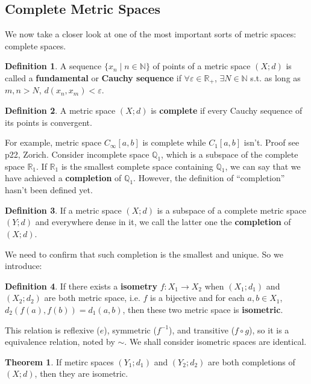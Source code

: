 \documentclass{article}
\theoremstyle{plain}
\theoremstyle{definition}
\newtheorem{dfn}{Definition}[section] %
\newtheorem{thrm}{Theorem}[section] %
\begin{document}
\subsection{Complete Metric Spaces}
We now take a closer look at one of the most important sorts of metric spaces: complete spaces.
\begin{dfn}\label{Cauchy_sequence}
A sequence $\{x_n\mid n\in \mathbb{N}\}$ of points of a metric space $(X;d)$ is called a \textbf{fundamental} or \textbf{Cauchy sequence} if $\forall \varepsilon \in\mathbb{R}_+$, $\exists N\in\mathbb{N}$ s.t. as long as $m,n> N$, $d(x_n,x_m) < \varepsilon$.
\end{dfn}
\begin{dfn}\label{complete_space}
A metric space $(X;d)$ is \textbf{complete} if every Cauchy sequence of its points is convergent.
\end{dfn}
For example, metric space $C_\infty[a,b]$ is complete while $C_1[a,b]$ isn't. Proof see p22, Zorich.
Consider incomplete space $\mathbb{Q}_1$, which is a subspace of the complete space $\mathbb{R}_1$. If $\mathbb{R}_1$ is the smallest complete space containing $\mathbb{Q}_1$, we can say that we have achieved a \textbf{completion} of $\mathbb{Q}_1$. However, the definition of ``completion'' hasn't been defined yet. 
\begin{dfn}\label{completion}
If a metric space $(X;d)$ is a subspace of a complete metric space $(Y;d)$ and everywhere dense in it, we call the latter one the \textbf{completion} of $(X;d)$. 
\end{dfn}
We need to confirm that such completion is the smallest and unique. So we introduce:
\begin{dfn}\label{isometric}
If there exists a \textbf{isometry} $f:X_1\to X_2$ when $(X_1;d_1)$ and $(X_2;d_2)$ are both metric space, i.e. $f$ is a bijective and for each $a,b\in X_1$, $d_2\left(f(a),f(b)\right)=d_1\left(a,b\right)$, then these two metric space is \textbf{isometric}.
\end{dfn}
This relation is reflexive ($e$), symmetric ($f ^{-1}$), and transitive ($f\circ g$), so it is a equivalence relation, noted by $\sim$. We shall consider isometric spaces are identical.
\begin{thrm}\label{completion_unique}
If metirc spaces $(Y_1;d_1)$ and $(Y_2;d_2)$ are both completions of $(X;d)$, then they are isometric.
\end{thrm}
\end{document}
